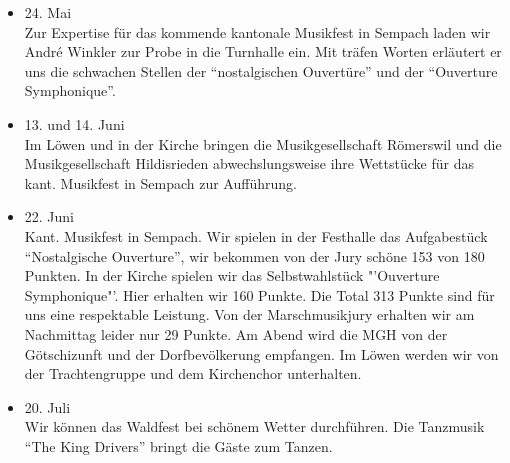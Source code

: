 \begin{multicols}{2}
\begin{itemize}
        \item[]24. Mai\\
        Zur Expertise für das kommende kantonale Musikfest in Sempach laden wir André Winkler zur
        Probe in die Turnhalle ein. Mit träfen Worten erläutert er uns die schwachen Stellen der
        "`nostalgischen Ouvertüre"' und der "`Ouverture Symphonique"'.

        \item[]13. und 14. Juni\\
        Im Löwen und in der Kirche bringen die Musikgesellschaft Römerswil und die Musikgesellschaft Hildisrieden
        abwechslungsweise ihre Wettstücke für das kant. Musikfest in Sempach zur Aufführung.

        \item[]22. Juni\\
        Kant. Musikfest in Sempach. Wir spielen in der Festhalle das Aufgabestück "`Nostalgische Ouverture"',
        wir bekommen von der Jury schöne 153 von 180 Punkten. In der Kirche spielen wir das Selbstwahlstück
        "'Ouverture Symphonique"'. Hier erhalten wir 160 Punkte. Die Total 313 Punkte sind für uns eine respektable Leistung.
        Von der Marschmusikjury erhalten wir am Nachmittag leider nur 29 Punkte.
        Am Abend wird die MGH von der Götschizunft und der Dorfbevölkerung empfangen.
        Im Löwen werden wir von der Trachtengruppe und dem Kirchenchor unterhalten.

        \item[]20. Juli\\
        Wir können das Waldfest bei schönem Wetter durchführen. Die Tanzmusik "`The King Drivers"'
        bringt die Gäste zum Tanzen.



    \end{itemize}

\end{multicols}

